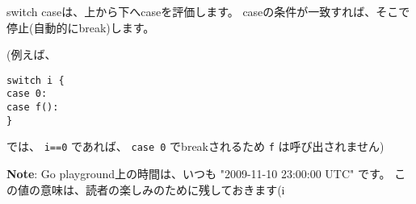 switch caseは、上から下へcaseを評価します。 
caseの条件が一致すれば、そこで停止(自動的にbreak)します。

(例えば、

\begin{lstlisting}[numbers=none]
switch i {
case 0:
case f():
}
\end{lstlisting}

では、 \texttt{i==0} であれば、 \texttt{case 0} でbreakされるため
\texttt{f} は呼び出されません)

\textbf{Note}: Go playground上の時間は、いつも "2009-11-10 23:00:00 UTC" です。
この値の意味は、読者の楽しみのために残しておきます(^^)